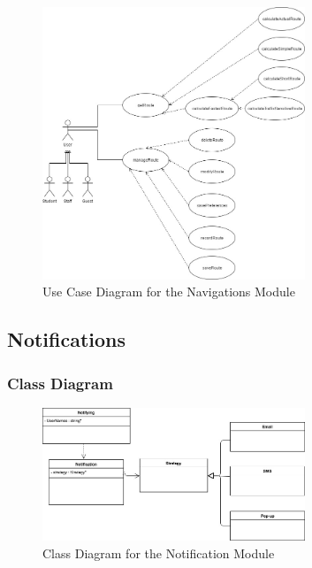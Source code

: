 \documentclass[runningheads,a4paper]{article}
\begin{document}
\begin{figure}[H]
   	\centering
   	\includegraphics[width=0.7\textwidth]{Navigation-Module-Use-Case.jpg}
   	\caption{Use Case Diagram for the Navigations Module}
\end{figure}


\subsection{Notifications}

\subsubsection{Class Diagram}
\begin{figure}[H]
   	\centering
   	\includegraphics[width=0.7\textwidth]{ClassDiagram.png}
   	\caption{Class Diagram for the Notification Module}
\end{figure}
\end{document}
